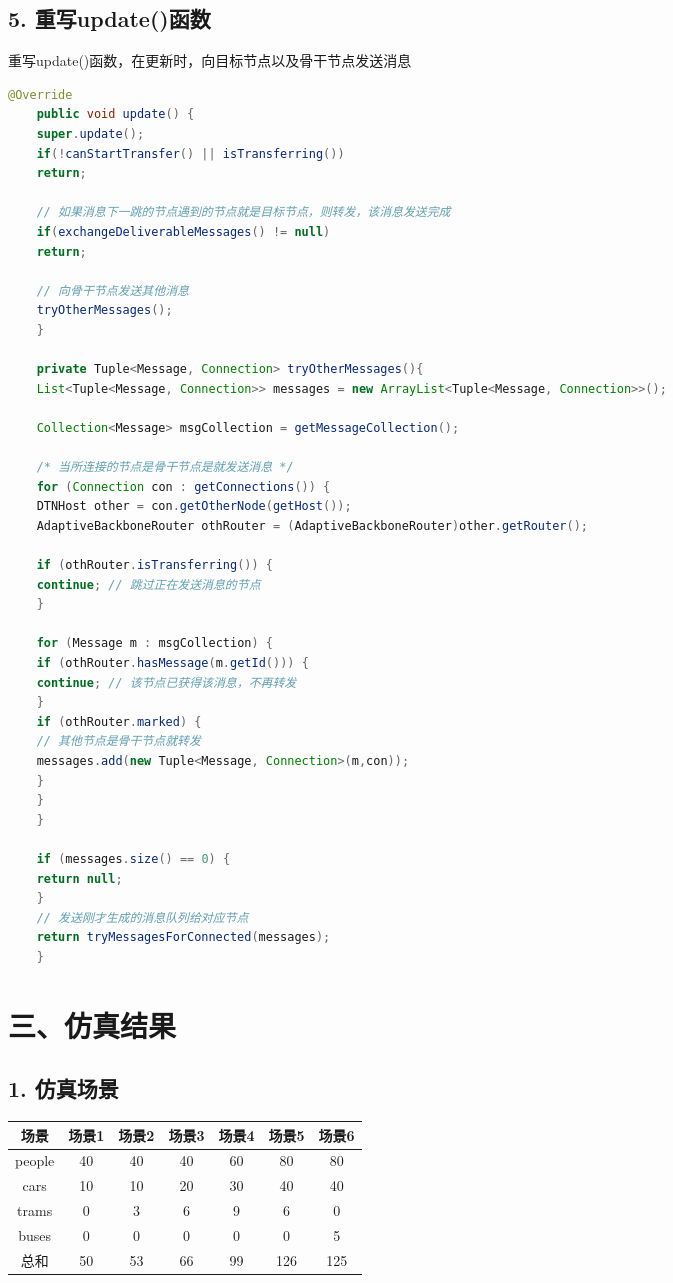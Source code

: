 \documentclass[lang=cn,11pt]{elegantpaper}
\begin{document}
	\subsection*{5. 重写update()函数}
	
	重写update()函数，在更新时，向目标节点以及骨干节点发送消息
	
	\begin{lstlisting}[language=Java]
	@Override
	public void update() {
	super.update();
	if(!canStartTransfer() || isTransferring())
	return;
	
	// 如果消息下一跳的节点遇到的节点就是目标节点，则转发，该消息发送完成
	if(exchangeDeliverableMessages() != null)
	return;
	
	// 向骨干节点发送其他消息
	tryOtherMessages();
	}
	
	private Tuple<Message, Connection> tryOtherMessages(){
	List<Tuple<Message, Connection>> messages = new ArrayList<Tuple<Message, Connection>>();
	
	Collection<Message> msgCollection = getMessageCollection();
	
	/* 当所连接的节点是骨干节点是就发送消息 */
	for (Connection con : getConnections()) {
	DTNHost other = con.getOtherNode(getHost());
	AdaptiveBackboneRouter othRouter = (AdaptiveBackboneRouter)other.getRouter();
	
	if (othRouter.isTransferring()) {
	continue; // 跳过正在发送消息的节点
	}
	
	for (Message m : msgCollection) {
	if (othRouter.hasMessage(m.getId())) {
	continue; // 该节点已获得该消息，不再转发
	}
	if (othRouter.marked) {
	// 其他节点是骨干节点就转发
	messages.add(new Tuple<Message, Connection>(m,con));
	}
	}
	}
	
	if (messages.size() == 0) {
	return null;
	}
	// 发送刚才生成的消息队列给对应节点
	return tryMessagesForConnected(messages);
	}
	\end{lstlisting}
	
\section*{三、仿真结果}
	
	\subsection*{1. 仿真场景}
	
	\begin{table}[h]
		\begin{tabular}{|c|c|c|c|c|c|c|}
			
			\hline 场景&场景1&场景2&场景3&场景4&场景5&场景6\\
			\hline people&40&40&40&60&80&80\\
			\hline cars&10&10&20&30&40&40\\
			\hline trams&0&3&6&9&6&0\\
			\hline buses&0&0&0&0&0&5\\
			\hline 总和&50&53&66&99&126&125\\
			
		\end{tabular}
	\end{table}
	
\end{document}

